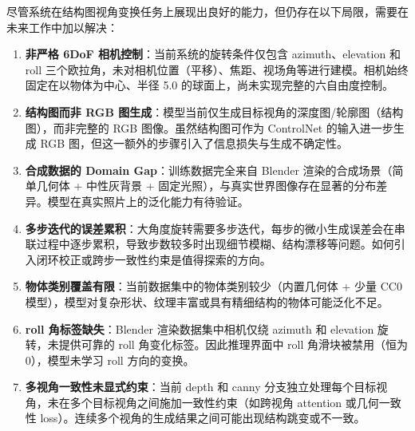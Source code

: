 尽管系统在结构图视角变换任务上展现出良好的能力，但仍存在以下局限，需要在未来工作中加以解决：

\begin{enumerate}[label=(\arabic*)]
    \item \textbf{非严格 6DoF 相机控制}：当前系统的旋转条件仅包含 azimuth、elevation 和 roll 三个欧拉角，未对相机位置（平移）、焦距、视场角等进行建模。相机始终固定在以物体为中心、半径 5.0 的球面上，尚未实现完整的六自由度控制。
    
    \item \textbf{结构图而非 RGB 图生成}：模型当前仅生成目标视角的深度图/轮廓图（结构图），而非完整的 RGB 图像。虽然结构图可作为 ControlNet 的输入进一步生成 RGB 图，但这一额外的步骤引入了信息损失与生成不确定性。
    
    \item \textbf{合成数据的 Domain Gap}：训练数据完全来自 Blender 渲染的合成场景（简单几何体 + 中性灰背景 + 固定光照），与真实世界图像存在显著的分布差异。模型在真实照片上的泛化能力有待验证。
    
    \item \textbf{多步迭代的误差累积}：大角度旋转需要多步迭代，每步的微小生成误差会在串联过程中逐步累积，导致步数较多时出现细节模糊、结构漂移等问题。如何引入闭环校正或跨步一致性约束是值得探索的方向。

    \item \textbf{物体类别覆盖有限}：当前数据集中的物体类别较少（内置几何体 + 少量 CC0 模型），模型对复杂形状、纹理丰富或具有精细结构的物体可能泛化不足。

    \item \textbf{roll 角标签缺失}：Blender 渲染数据集中相机仅绕 azimuth 和 elevation 旋转，未提供可靠的 roll 角变化标签。因此推理界面中 roll 角滑块被禁用（恒为 0），模型未学习 roll 方向的变换。
    
    \item \textbf{多视角一致性未显式约束}：当前 depth 和 canny 分支独立处理每个目标视角，未在多个目标视角之间施加一致性约束（如跨视角 attention 或几何一致性 loss）。连续多个视角的生成结果之间可能出现结构跳变或不一致。
\end{enumerate}
